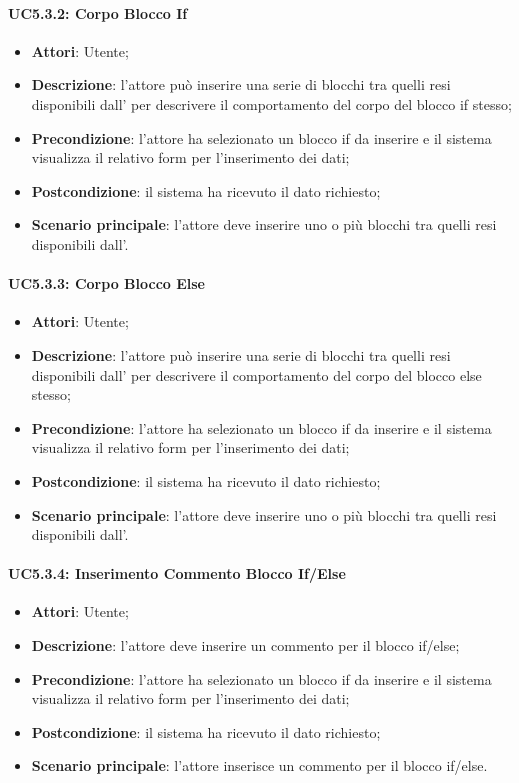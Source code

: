 \paragraph{UC5.3.2: Corpo Blocco If}
\label{UC5.3.2}
\begin{itemize}
\item \textbf{Attori}: Utente;
\item \textbf{Descrizione}: l'attore può inserire una serie di blocchi tra quelli resi disponibili dall' per descrivere il comportamento del corpo del blocco if stesso;	
\item \textbf{Precondizione}: l'attore ha selezionato un blocco if da inserire e il sistema visualizza il relativo form per l'inserimento dei dati;	
\item \textbf{Postcondizione}: il sistema ha ricevuto il dato richiesto;	
\item \textbf{Scenario principale}:
l'attore deve inserire uno o più blocchi tra quelli resi disponibili dall'.	
\end{itemize}

\paragraph{UC5.3.3: Corpo Blocco Else	}
\label{UC5.3.3}
\begin{itemize}
\item \textbf{Attori}: Utente;
\item \textbf{Descrizione}: l'attore può inserire una serie di blocchi tra quelli resi disponibili dall' per descrivere il comportamento del corpo del blocco else stesso;	
\item \textbf{Precondizione}: l'attore ha selezionato un blocco if da inserire e il sistema visualizza il relativo form per l'inserimento dei dati;	
\item \textbf{Postcondizione}: il sistema ha ricevuto il dato richiesto;	
\item \textbf{Scenario principale}:
l'attore deve inserire uno o più blocchi tra quelli resi disponibili dall'.	
\end{itemize}

\paragraph{UC5.3.4: Inserimento Commento Blocco If/Else	}
\label{UC5.3.4}
\begin{itemize}
\item \textbf{Attori}: Utente;
\item \textbf{Descrizione}: l'attore deve inserire un commento per il blocco if/else;	
\item \textbf{Precondizione}: l'attore ha selezionato un blocco if da inserire e il sistema visualizza il relativo form per l'inserimento dei dati;	
\item \textbf{Postcondizione}: il sistema ha ricevuto il dato richiesto;	
\item \textbf{Scenario principale}:
l'attore inserisce un commento per il blocco if/else.
\end{itemize}

